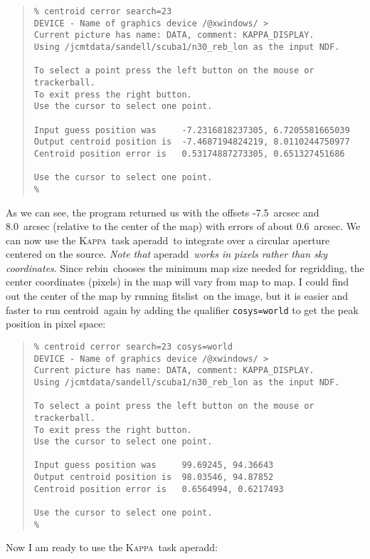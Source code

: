 \documentclass[twoside,11pt]{article}
\newenvironment{myquote}{\begin{quote}\begin{small}}{\end{small}\end{quote}}
\newcommand{\Kappa}{\xref{\textsc{Kappa}}{sun95}{}}
\newcommand{\task}[1]{\textsf{#1}}
\newcommand{\param}[1]{\texttt{#1}}
\newcommand{\rebin}{\xref{\task{rebin}}{sun216}{REBIN}}
\newcommand{\aperadd}{\xref{\task{aperadd}}{sun95}{APERADD}}
\newcommand{\centroid}{\xref{\task{centroid}}{sun95}{CENTROID}}
\newcommand{\fitslist}{\xref{\task{fitslist}}{sun95}{FITSLIST}}
\newcommand{\xref}[3]{#1}
\begin{document}
\begin{myquote} \begin{verbatim}
% centroid cerror search=23
DEVICE - Name of graphics device /@xwindows/ > 
Current picture has name: DATA, comment: KAPPA_DISPLAY.
Using /jcmtdata/sandell/scuba1/n30_reb_lon as the input NDF.
 
To select a point press the left button on the mouse or trackerball.
To exit press the right button.
Use the cursor to select one point.

Input guess position was     -7.2316818237305, 6.7205581665039
Output centroid position is  -7.4687194824219, 8.0110244750977
Centroid position error is   0.53174887273305, 0.651327451686
 
Use the cursor to select one point.
% 
\end{verbatim} \end{myquote}

As we can see, the program returned us with the offsets -7.5~arcsec and 8.0~arcsec
(relative to the center of the map) with errors of about 0.6~arcsec. We can now
use the \Kappa\ task \aperadd\ to integrate over a circular aperture
centered on the source.  {\it Note that} \aperadd\ {\it works in
pixels rather than sky coordinates}. Since \rebin\ chooses the
minimum map size needed for regridding, the center coordinates (pixels)
in the map will vary from map to map. I could find out the center of the
map by running \fitslist\ on the image, but it is easier and faster
to run \centroid\ again by adding the qualifier \texttt{\param{cosys}=world}
to get the peak position in pixel space:

\begin{myquote} \begin{verbatim} 
% centroid cerror search=23 cosys=world
DEVICE - Name of graphics device /@xwindows/ > 
Current picture has name: DATA, comment: KAPPA_DISPLAY.
Using /jcmtdata/sandell/scuba1/n30_reb_lon as the input NDF.
 
To select a point press the left button on the mouse or trackerball.
To exit press the right button.
Use the cursor to select one point.

Input guess position was     99.69245, 94.36643
Output centroid position is  98.03546, 94.87852
Centroid position error is   0.6564994, 0.6217493
 
Use the cursor to select one point.
% 
\end{verbatim} \end{myquote}

Now I am ready to use the \Kappa\ task \aperadd:
\end{document}
